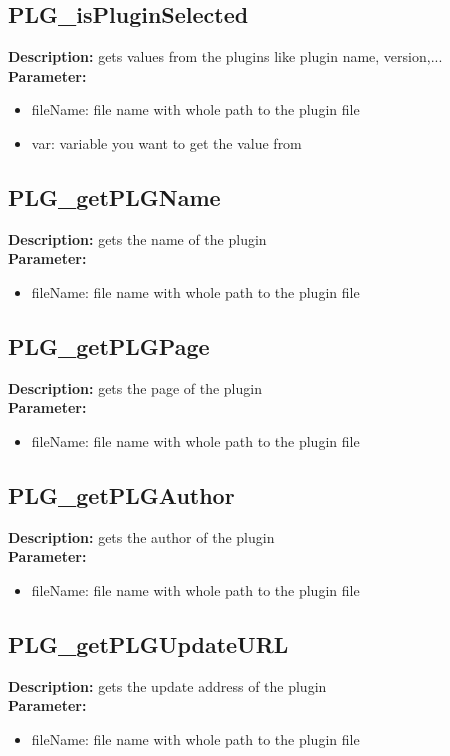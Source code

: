 \subsection{PLG\_isPluginSelected}
\textbf{Description:} gets values from the plugins like plugin name, version,...\\
\textbf{Parameter:}
\begin{itemize}
\item fileName: file name with whole path to the plugin file
\item var: variable you want to get the value from
\end{itemize}

\subsection{PLG\_getPLGName}
\textbf{Description:} gets the name of the plugin\\
\textbf{Parameter:}
\begin{itemize}
\item fileName: file name with whole path to the plugin file
\end{itemize}

\subsection{PLG\_getPLGPage}
\textbf{Description:} gets the page of the plugin\\
\textbf{Parameter:}
\begin{itemize}
\item fileName: file name with whole path to the plugin file
\end{itemize}

\subsection{PLG\_getPLGAuthor}
\textbf{Description:} gets the author of the plugin\\
\textbf{Parameter:}
\begin{itemize}
\item fileName: file name with whole path to the plugin file
\end{itemize}

\subsection{PLG\_getPLGUpdateURL}
\textbf{Description:} gets the update address of the plugin\\
\textbf{Parameter:}
\begin{itemize}
\item fileName: file name with whole path to the plugin file
\end{itemize}


